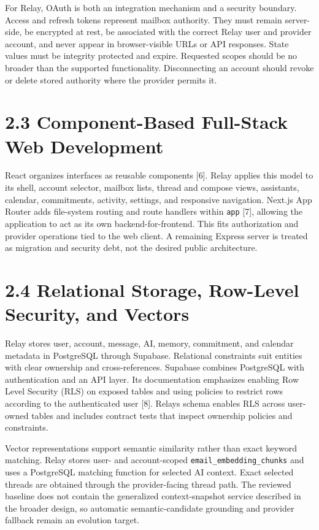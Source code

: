 \documentclass[
]{report}
\begin{document}
For Relay, OAuth is both an integration mechanism and a security
boundary. Access and refresh tokens represent mailbox authority. They
must remain server-side, be encrypted at rest, be associated with the
correct Relay user and provider account, and never appear in
browser-visible URLs or API responses. State values must be integrity
protected and expire. Requested scopes should be no broader than the
supported functionality. Disconnecting an account should revoke or
delete stored authority where the provider permits it.

\section{2.3 Component-Based Full-Stack Web
Development}\label{23-component-based-full-stack-web-development}

React organizes interfaces as reusable components {[}6{]}. Relay applies
this model to its shell, account selector, mailbox lists, thread and
compose views, assistants, calendar, commitments, activity, settings,
and responsive navigation. Next.js App Router adds file-system routing
and route handlers within \texttt{app} {[}7{]}, allowing the application
to act as its own backend-for-frontend. This fits authorization and
provider operations tied to the web client. A remaining Express server
is treated as migration and security debt, not the desired public
architecture.

\section{2.4 Relational Storage, Row-Level Security, and
Vectors}\label{24-relational-storage-row-level-security-and-vectors}

Relay stores user, account, message, AI, memory, commitment, and
calendar metadata in PostgreSQL through Supabase. Relational constraints
suit entities with clear ownership and cross-references. Supabase
combines PostgreSQL with authentication and an API layer. Its
documentation emphasizes enabling Row Level Security (RLS) on exposed
tables and using policies to restrict rows according to the
authenticated user {[}8{]}. Relay\textquotesingle s schema enables RLS
across user-owned tables and includes contract tests that inspect
ownership policies and constraints.

Vector representations support semantic similarity rather than exact
keyword matching. Relay stores user- and account-scoped
\texttt{email\_embedding\_chunks} and uses a PostgreSQL matching function
for selected AI context. Exact selected threads are obtained through the
provider-facing thread path. The reviewed baseline does not contain the
generalized context-snapshot service described in the broader design, so
automatic semantic-candidate grounding and provider fallback remain an
evolution target.
\end{document}
